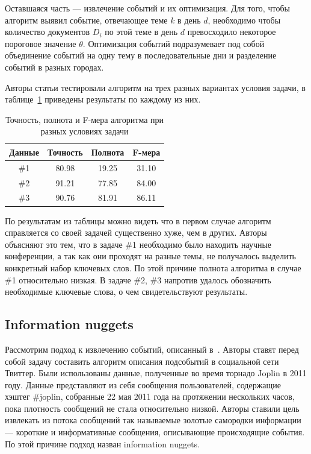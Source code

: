 \documentclass[12pt, a4paper]{article}
\begin{document}
	Оставшаяся часть --- извлечение событий и их оптимизация. Для того, чтобы алгоритм выявил событие, отвечающее теме $k$ в день $d$, необходимо чтобы количество документов $D_i$ по этой теме в день $d$ превосходило некоторое пороговое значение $\theta$. Оптимизация событий подразумевает под собой объединение событий на одну тему в последовательные дни и разделение событий в разных городах.
	
	Авторы статьи тестировали алгоритм на трех разных вариантах условия задачи, в таблице~\ref{lda-table} приведены результаты по каждому из них.
	
\begin{table}[h]
	\centering
    \begin{tabular}{c c c c}
    Данные & Точность & Полнота & F-мера \\ \hline
    \#1 & 80.98 & 19.25 & 31.10 \\ 
    \#2 & 91.21 & 77.85 & 84.00  \\ 
    \#3 & 90.76 & 81.91 & 86.11 \\ \hline
    \end{tabular}
    \caption{Точность, полнота и F-мера алгоритма при разных условиях задачи}
    \label{lda-table}
\end{table}

	По результатам из таблицы можно видеть что в первом случае алгоритм справляется со своей задачей существенно хуже, чем в других. Авторы объясняют это тем, что в задаче \#1 необходимо было находить научные конференции, а так как они проходят на разные темы, не получалось выделить конкретный набор ключевых слов. По этой причине полнота алгоритма в случае \#1 относительно низкая. В задаче \#2, \#3 напротив удалось обозначить необходимые ключевые слова, о чем свидетельствуют результаты.
	
	\subsection{Information nuggets}
	Рассмотрим подход к извлечению событий, описанный в~\cite{nuggets}. Авторы ставят перед собой задачу составить алгоритм описания подсобытий в социальной сети Твиттер. Были использованы данные, полученные во время торнадо Joplin в 2011 году. Данные представляют из себя сообщения пользователей, содержащие хэштег \#joplin, собранные 22 мая 2011 года на протяжении нескольких часов, пока плотность сообщений не стала относительно низкой. Авторы ставили цель извлекать из потока сообщений так называемые золотые самородки информации --- короткие и информативные сообщения, описывающие происходящие события. По этой причине подход назван information nuggets.
	
\end{document}
